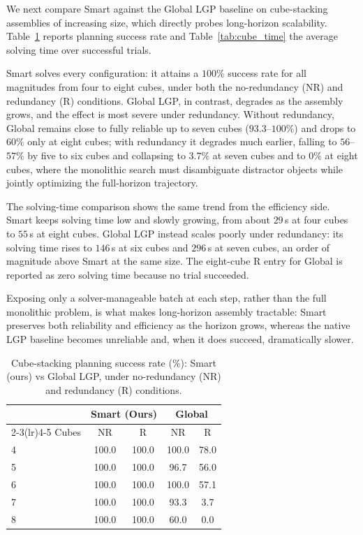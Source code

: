 \documentclass[journal]{IEEEtran}
\begin{document}
We next compare Smart against the Global LGP baseline on cube-stacking
assemblies of increasing size, which directly probes long-horizon scalability.
Table~\ref{tab:cube_sr} reports planning success rate and
Table~\ref{tab:cube_time} the average solving time over successful trials.

Smart solves every configuration: it attains a $100\%$ success rate for all
magnitudes from four to eight cubes, under both the no-redundancy (NR) and
redundancy (R) conditions. Global LGP, in contrast, degrades as the assembly
grows, and the effect is most severe under redundancy. Without redundancy,
Global remains close to fully reliable up to seven cubes ($93.3$--$100\%$) and
drops to $60\%$ only at eight cubes; with redundancy it degrades much earlier,
falling to $56$--$57\%$ by five to six cubes and collapsing to $3.7\%$ at seven
cubes and to $0\%$ at eight cubes, where the monolithic search must
disambiguate distractor objects while jointly optimizing the full-horizon
trajectory.

The solving-time comparison shows the same trend from the efficiency side.
Smart keeps solving time low and slowly growing, from about $29$\,s at four
cubes to $55$\,s at eight cubes. Global LGP instead scales poorly under
redundancy: its solving time rises to $146$\,s at six cubes and $296$\,s at
seven cubes, an order of magnitude above Smart at the same size. The eight-cube
R entry for Global is reported as zero solving time because no trial succeeded.

Exposing only a solver-manageable batch at
each step, rather than the full monolithic problem, is what makes long-horizon
assembly tractable: Smart preserves both reliability and efficiency as the
horizon grows, whereas the native LGP baseline becomes unreliable and, when it
does succeed, dramatically slower.

\begin{table}[!t]
\centering
\caption{Cube-stacking planning success rate (\%): Smart (ours) vs Global LGP,
under no-redundancy (NR) and redundancy (R) conditions.}
\label{tab:cube_sr}
\begin{tabular}{lcccc}
\toprule
 & \multicolumn{2}{c}{Smart (Ours)} & \multicolumn{2}{c}{Global} \\
\cmidrule(lr){2-3}\cmidrule(lr){4-5}
Cubes & NR & R & NR & R \\
\midrule
4 & 100.0 & 100.0 & 100.0 & 78.0 \\
5 & 100.0 & 100.0 & \phantom{0}96.7 & 56.0 \\
6 & 100.0 & 100.0 & 100.0 & 57.1 \\
7 & 100.0 & 100.0 & \phantom{0}93.3 & \phantom{0}3.7 \\
8 & 100.0 & 100.0 & \phantom{0}60.0 & \phantom{0}0.0 \\
\bottomrule
\end{tabular}
\end{table}
\end{document}
